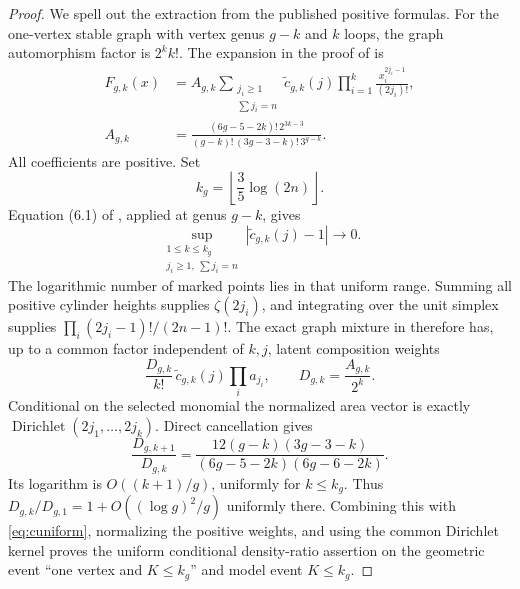 \documentclass[11pt]{article}
\theoremstyle{remark}\newtheorem{remark}[theorem]{Remark}
\newcommand{\Dir}{\operatorname{Dirichlet}}\newcommand{\PPP}{\operatorname{PPP}}
\begin{document}
\begin{proof}
We spell out the extraction from the published positive formulas. For the one-vertex stable graph with vertex genus $g-k$ and $k$ loops, the graph automorphism factor is $2^k k!$. The expansion in the proof of \cite[Lemma 6.4]{DL} is
\begin{align}
 F_{g,k}(x)&=A_{g,k}\sum_{\substack{j_i\ge1\\\sum j_i=n}}
 \widetilde c_{g,k}(j)\prod_{i=1}^k\frac{x_i^{2j_i-1}}{(2j_i)!},\label{eq:F}\\
 A_{g,k}&=\frac{(6g-5-2k)!\,2^{3k-3}}{(g-k)!\,(3g-3-k)!\,3^{g-k}}.\nonumber
\end{align}
All coefficients are positive. Set
\begin{equation}\label{eq:cutoff}
 k_g=\left\lfloor\frac35\log(2n)\right\rfloor.
\end{equation}
Equation (6.1) of \cite{DL}, applied at genus $g-k$, gives
\begin{equation}\label{eq:cuniform}
 \sup_{\substack{1\le k\le k_g\\j_i\ge1,\ \sum j_i=n}}
 |\widetilde c_{g,k}(j)-1|\longrightarrow0.
\end{equation}
The logarithmic number of marked points lies in that uniform range. Summing all positive cylinder heights supplies $\zeta(2j_i)$, and integrating over the unit simplex supplies $\prod_i(2j_i-1)!/(2n-1)!$. The exact graph mixture in \cite[Theorem 3.2]{DL} therefore has, up to a common factor independent of $k,j$, latent composition weights
\begin{equation}\label{eq:weights}
 \frac{D_{g,k}}{k!}\,\widetilde c_{g,k}(j)\prod_i a_{j_i},\qquad
 D_{g,k}=\frac{A_{g,k}}{2^k}.
\end{equation}
Conditional on the selected monomial the normalized area vector is exactly $\Dir(2j_1,\ldots,2j_k)$. Direct cancellation gives
\[
 \frac{D_{g,k+1}}{D_{g,k}}
 =\frac{12(g-k)(3g-3-k)}{(6g-5-2k)(6g-6-2k)}.
\]
Its logarithm is $O((k+1)/g)$, uniformly for $k\le k_g$. Thus $D_{g,k}/D_{g,1}=1+O((\log g)^2/g)$ uniformly there. Combining this with \eqref{eq:cuniform}, normalizing the positive weights, and using the common Dirichlet kernel proves the uniform conditional density-ratio assertion on the geometric event ``one vertex and $K\le k_g$'' and model event $K\le k_g$.


\end{proof}
\end{document}

